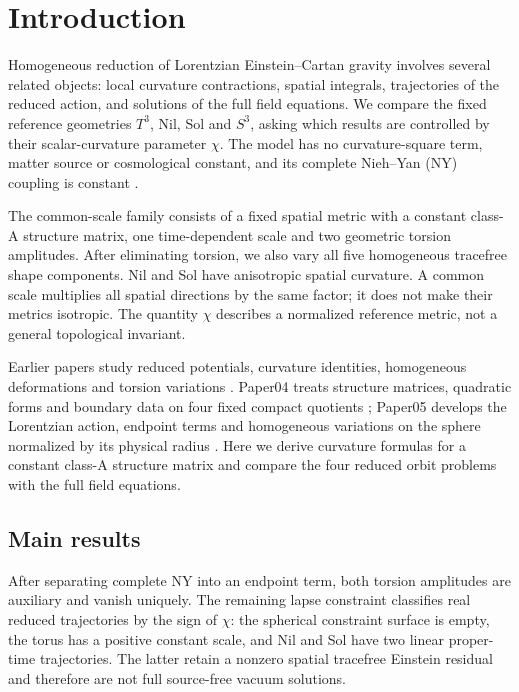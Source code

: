 \section{Introduction}

Homogeneous reduction of Lorentzian Einstein--Cartan gravity involves several related objects: local curvature contractions, spatial integrals, trajectories of the reduced action, and solutions of the full field equations. We compare the fixed reference geometries $T^3$, Nil, Sol and $S^3$, asking which results are controlled by their scalar-curvature parameter $\chi$. The model has no curvature-square term, matter source or cosmological constant, and its complete Nieh--Yan (NY) coupling is constant \cite{Hehl1976,NiehYan1982}.

The common-scale family consists of a fixed spatial metric with a constant class-A structure matrix, one time-dependent scale and two geometric torsion amplitudes. After eliminating torsion, we also vary all five homogeneous tracefree shape components. Nil and Sol have anisotropic spatial curvature. A common scale multiplies all spatial directions by the same factor; it does not make their metrics isotropic. The quantity $\chi$ describes a normalized reference metric, not a general topological invariant.

Earlier papers study reduced potentials, curvature identities, homogeneous deformations and torsion variations \cite{paper1,paper2,paper3,paper3ec}. Paper04 treats structure matrices, quadratic forms and boundary data on four fixed compact quotients \cite{paper4}; Paper05 develops the Lorentzian action, endpoint terms and homogeneous variations on the sphere normalized by its physical radius \cite{paper5}. Here we derive curvature formulas for a constant class-A structure matrix and compare the four reduced orbit problems with the full field equations.

\subsection{Main results}

After separating complete NY into an endpoint term, both torsion amplitudes are auxiliary and vanish uniquely. The remaining lapse constraint classifies real reduced trajectories by the sign of $\chi$: the spherical constraint surface is empty, the torus has a positive constant scale, and Nil and Sol have two linear proper-time trajectories. The latter retain a nonzero spatial tracefree Einstein residual and therefore are not full source-free vacuum solutions.

